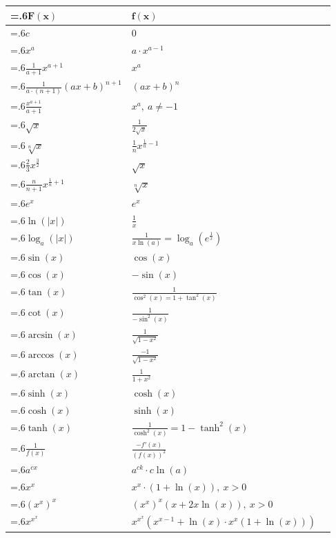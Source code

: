\documentclass[a4paper, 10pt]{article}
\theoremstyle{definition}
\theoremstyle{named}
\begin{document}
\begin{tabularx}{\linewidth}{>{\hsize=.6\hsize\centering\arraybackslash}X|>{\centering\arraybackslash}XX}
    $\mathbf{F(x)}$ & $\mathbf{f(x)}$ \\
    \midrule
    $c$ & $0$ \\
    $x^a$ & $a \cdot x^{a - 1}$ \\
    $\frac{1}{a+1} x^{a + 1}$ & $x^a$ \\
    $\frac{1}{a \cdot (n + 1)} (ax + b)^{n + 1}$ & $(ax + b)^n$ \\
    $\frac{x^{a + 1}}{a + 1}$ & $x^a, \ a \neq -1$ \\
    $\sqrt{x}$ & $\frac{1}{2\sqrt{x}}$ \\
    $\sqrt[n]{x}$ & $\frac{1}{n}x^{\frac{1}{n} - 1}$ \\
    $\frac{2}{3}x^{\frac{3}{2}}$ & $\sqrt{x}$ \\
    $\frac{n}{n+1} x^{\frac{1}{n} + 1}$ & $\sqrt[n]{x}$ \\
    $e^x$ & $e^x$ \\
    $\ln(|x|)$ & $\frac{1}{x}$ \\
    $\log_a(|x|)$ & $\frac{1}{x \ln(a)} = \log_a(e^\frac{1}{x})$ \\
    $\sin(x)$ & $\cos(x)$ \\
    $\cos(x)$ & $-\sin(x)$ \\
    $\tan(x)$ & $\frac{1}{\cos^2(x) = 1 + \tan^2(x)}$ \\
    $\cot(x)$ & $\frac{1}{-\sin^2(x)}$ \\
    $\arcsin(x)$ & $\frac{1}{\sqrt{1 - x^2}}$ \\
    $\arccos(x)$ & $\frac{-1}{\sqrt{1 - x^2}}$ \\
    $\arctan(x)$ & $\frac{1}{1 + x^2}$ \\
    $\sinh(x)$ & $\cosh(x)$ \\
    $\cosh(x)$ & $\sinh(x)$ \\
    $\tanh(x)$ & $\frac{1}{\cosh^2(x)} = 1 - \tanh^2(x)$ \\
    $\frac{1}{f(x)}$ & $\frac{-f'(x)}{(f(x))^2}$ \\
    $a^{cx}$ & $a^{ck} \cdot c \ln(a)$ \\
    $x^x$ & $x^x \cdot (1 + \ln(x)), \ x > 0$ \\
    $(x^x)^x$ & $(x^x)^x (x + 2x \ln(x)), \ x > 0$ \\
    $x^{x^x}$ & $x^{x^x} (x^{x - 1} + \ln(x) \cdot x^x (1 + \ln(x)))$ \\
\end{tabularx}
\end{document}
